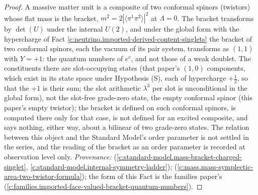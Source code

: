 \documentclass[11pt]{article}
\theoremstyle{definition}
\theoremstyle{plain}
\providecommand{\br}{}\renewcommand{\br}[1]{\langle #1\rangle}
\begin{document}
\begin{proof}
A massive matter unit is a composite of two conformal spinors (twistors) whose flat mass is the bracket, $m^{2} = 2|\br{\pi^{1}\pi^{2}}|^{2}$ at $\Lambda = 0$. The bracket transforms by $\det(U)$ under the internal $U(2)$, and under the global form with the hypercharge of Fact \ref{c:neutrino.imported-derived-content-singlets} the bracket of two conformal spinors, each the vacuum of its pair system, transforms as $(1,1)$ with $Y = +1$: the quantum numbers of $e^{c}$, and not those of a weak doublet. The constituents there are slot-occupying states (that paper's $(1,0)$ components, which exist in its state space under Hypothesis (S), each of hypercharge $+\tfrac12$, so that the $+1$ is their sum; the slot arithmetic $\lambda^{3}$ per slot is unconditional in the global form), not the slot-free grade-zero state, the empty conformal spinor (this paper's empty twistor); the bracket is defined on such conformal spinors, is computed there only for that case, is not defined for an excited composite, and says nothing, either way, about a bilinear of two grade-zero states. The relation between this object and the Standard Model's order parameter is not settled in the series, and the reading of the bracket as an order parameter is recorded at observation level only. \emph{Provenance:} \cite[Props.~3.1-3.2]{ButlerT12} (\ref{c:standard-model.mass-bracket-charged-singlet}, \ref{c:standard-model.internal-symmetry-ladder}); \cite[Prop.~4.1]{ButlerT11} (\ref{c:mass.mass-symplectic-area-two-twistor-formula}); the form of this Fact is the families paper's \cite[Fact~2.1]{ButlerT13} (\ref{c:families.imported-face-valued-bracket-quantum-numbers}).

\end{proof}
\end{document}
